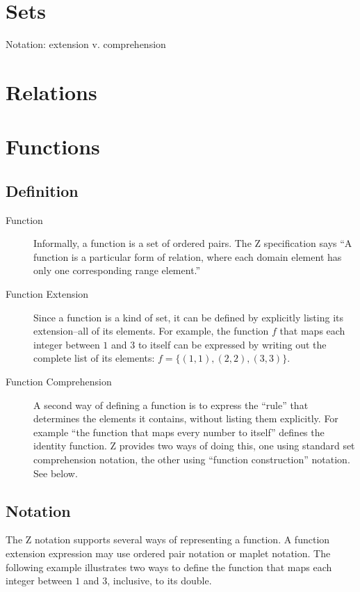 \documentclass[reqno,12pt]{tufte-book}
\numberwithin{equation}{subsection}
\begin{document}
\section{Sets}

Notation: extension v. comprehension


\section{Relations}

\section{Functions}


\subsection{Definition}

\begin{description}
\item [Function] Informally, a function is a set of ordered pairs.
  The Z specification says ``A function is a particular form of
  relation, where each domain element has only one corresponding range
  element.''\cite{z-iso-13568}%
\item [Function Extension] Since a function is a kind of set, it can
  be defined by explicitly listing its extension--all of its elements.
  For example, the function $f$ that maps each integer between $1$ and
  $3$ to itself can be expressed by writing out the complete list of
  its elements: ${f=\{(1,1),(2,2),(3,3)\}}$.
\item [Function Comprehension] A second way of defining a function is
  to express the ``rule'' that determines the elements it contains,
  without listing them explicitly.  For example ``the function that
  maps every number to itself'' defines the identity function.  Z provides
  two ways of doing this, one using standard set comprehension
  notation, the other using ``function construction'' notation.  See
  below.
\end{description}

\subsection{Notation}

The Z notation supports several ways of representing a function.  A
function extension expression may use ordered pair notation or maplet
notation.  The following example illustrates two ways to define the
function that maps each integer between $1$ and $3$, inclusive, to its
double.
\end{document}
